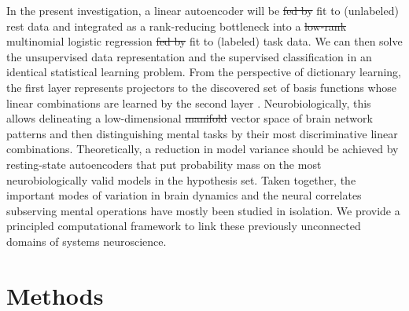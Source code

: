 \documentclass{article} %
\newcommand{\suggestadd}[1]{{\color{blue} #1}}
\newcommand{\suggestremove}[1]{{\color{red} \sout{#1}}}
\begin{document}
In the present investigation,
a linear autoencoder will be \suggestremove{fed by} \suggestadd{fit to} 
(unlabeled) rest data and
integrated as \suggestadd{a rank-reducing} bottleneck
into a \suggestremove{low-rank} \suggestadd{multinomial} 
logistic regression \suggestremove{fed by} \suggestadd{fit to} 
(labeled) task data.
We can then solve the unsupervised data representation and the
supervised classification in an identical statistical learning
problem.
%
From the perspective of dictionary learning, the first layer represents
\suggestadd{projectors to} the discovered set of basis functions
whose linear combinations are learned
by the second layer \cite{olshausen96}.
%
Neurobiologically, this allows 
delineating a low-dimensional \suggestremove{manifold}
\suggestadd{vector space} of brain network patterns and then 
distinguishing mental tasks
by their most discriminative linear combinations.
%
Theoretically, a reduction in model variance should be achieved by
resting-state autoencoders that
put probability mass on the most neurobiologically
valid models in the hypothesis set.
%
Taken together,
the important modes of variation in brain dynamics and
the neural correlates subserving mental operations
have mostly been studied in isolation.
We provide a principled computational framework to link these previously
unconnected domains of systems neuroscience.

\section{Methods}
%
\end{document}

